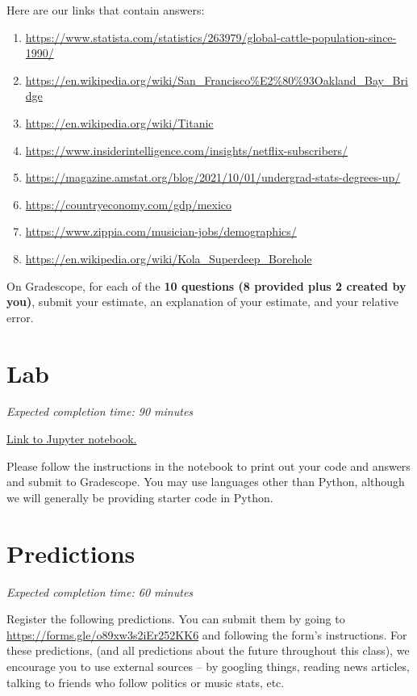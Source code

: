 \documentclass[11pt]{article}
\begin{document}
Here are our links that contain answers:
\begin{enumerate}
\item \url{https://www.statista.com/statistics/263979/global-cattle-population-since-1990/}
\item \url{https://en.wikipedia.org/wiki/San_Francisco%E2%80%93Oakland_Bay_Bridge}
\item \url{https://en.wikipedia.org/wiki/Titanic}
\item \url{https://www.insiderintelligence.com/insights/netflix-subscribers/}
\item \url{https://magazine.amstat.org/blog/2021/10/01/undergrad-stats-degrees-up/}
\item \url{https://countryeconomy.com/gdp/mexico}
\item \url{https://www.zippia.com/musician-jobs/demographics/}
\item \url{https://en.wikipedia.org/wiki/Kola_Superdeep_Borehole}
\end{enumerate}

On Gradescope, for each of the \textbf{10 questions (8 provided plus 2 created by you)}, submit your estimate, an explanation of your estimate, and your relative error.


\section*{Lab}

\emph{Expected completion time: 90 minutes}

\href{https://datahub.berkeley.edu/hub/user-redirect/git-pull?repo=https%3A%2F%2Fgithub.com%2Fjs-d%2Fstat-157-260-website&urlpath=tree%2Fstat-157-260-website%2Fhw%2Fhw2%2Fhw2_lab.ipynb&branch=main}{Link to Jupyter notebook.} 

Please follow the instructions in the notebook to print out your code and answers and submit to Gradescope. You may use languages other than Python, although we will generally be providing starter code in Python.



\section*{Predictions}

\emph{Expected completion time: 60 minutes}

Register the following predictions. You can submit them by going to \url{https://forms.gle/o89xw3s2iEr252KK6} and following the form's instructions. For these predictions, (and all predictions about the future throughout this class), we encourage you to use external sources -- by googling things, reading news articles, talking to friends who follow politics or music stats, etc.
\end{document}
